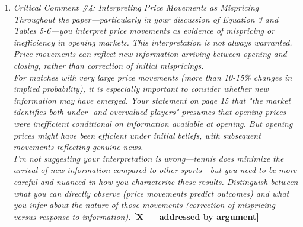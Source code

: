 \documentclass[letterpaper,12pt]{article}
\newcounter{b}
\newcommand{\argX}{\textcolor{green!55!black}{\textbf{[X --- addressed by argument]}}}
\newcommand{\Reply}[1]{\par\noindent\textbf{Reply:} #1}
\begin{document}
\begin{enumerate}
\Reply{We agree that percentile-based timing implicitly assumes a form of scale invariance in the learning process that need not hold if betting activity concentrates in absolute time (e.g., in the final hour) regardless of the total window length, and we will add this limitation explicitly to Sections~3 and~6. We note that the potential distortion is mitigated, though not eliminated, in our setting because betting windows are comparatively homogeneous: after restricting the sample to time series with durations between the thresholds reported in Section~4.1, the mean betting window is 26.7 hours with a standard deviation of 14.8 hours (Table~1) -- a narrower relative spread than the referee's illustrative 9-versus-18-hour comparison, though not narrow enough to rule out the concern entirely. We will revise the text to caveat explicitly that our percentile-based results represent an average pattern across matches with heterogeneous absolute window lengths, and that a one-percentile increment corresponds to different amounts of absolute time for different matches, tempering claims that rely on precise percentile locations (e.g., the ``12th to 30th percentile'' pause in learning identified in Section~5.4).}

\item \textit{Critical Comment \#4: Interpreting Price Movements as Mispricing\\[6pt]
Throughout the paper—particularly in your discussion of Equation 3 and Tables 5-6—you interpret price movements as evidence of mispricing or inefficiency in opening markets. This interpretation is not always warranted. Price movements can reflect new information arriving between opening and closing, rather than correction of initial mispricings.\\[6pt]
For matches with very large price movements (more than 10-15\% changes in implied probability), it is especially important to consider whether new information may have emerged. Your statement on page 15 that "the market identifies both under- and overvalued players" presumes that opening prices were inefficient conditional on information available at opening. But opening prices might have been efficient under initial beliefs, with subsequent movements reflecting genuine news.\\[6pt]
I'm not suggesting your interpretation is wrong—tennis does minimize the arrival of new information compared to other sports—but you need to be more careful and nuanced in how you characterize these results. Distinguish between what you can directly observe (price movements predict outcomes) and what you infer about the nature of those movements (correction of mispricing versus response to information).} \argX


\end{enumerate}
\end{document}
